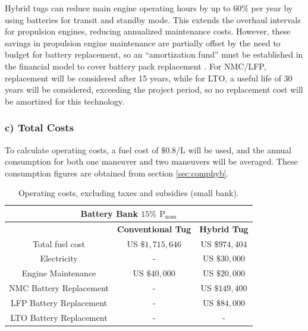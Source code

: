 Hybrid tugs can reduce main engine operating hours by up to $60\%$ per year by using batteries for transit and standby mode. This extends the overhaul intervals for propulsion engines, reducing annualized maintenance costs. However, these savings in propulsion engine maintenance are partially offset by the need to budget for battery replacement, so an “amortization fund” must be established in the financial model to cover battery pack replacement \cite{Wartsila2}. For NMC/LFP, replacement will be considered after 15 years, while for LTO, a useful life of 30 years will be considered, exceeding the project period, so no replacement cost will be amortized for this technology.

\subsubsection{c) Total Costs}

To calculate operating costs, a fuel cost of $\$0.8$/L will be used, and the annual consumption for both one maneuver and two maneuvers will be averaged. These consumption figures are obtained from section \ref{sec:comphyb}.


\begin{table}[H]
	\centering
	\caption{Operating costs, excluding taxes and subsidies (small bank).}
	\label{tab:Op1}
	\begin{tabular}{|c|c|c|}
		\hline
		\multicolumn{3}{|c|}{Battery Bank $15\%$ ${\text{P}}_{\text{nom}}$} \\
		\hline\hline
                   & \textbf{Conventional Tug} & \textbf{Hybrid Tug}\\
		 \hline
   Total fuel cost & US $\$1,715,646$ & US $\$974,404$\\
		 \hline
   Electricity & - & US $\$30,000$\\
		 \hline
   Engine Maintenance & US $\$40,000$ & US $\$20,000$\\
   		 \hline \hline
   NMC Battery Replacement & - & US $\$149,400$\\
		 \hline
   LFP Battery Replacement & - & US $\$84,000$\\
		 \hline
   LTO Battery Replacement & - & - \\
		 \hline
	\end{tabular}
\end{table}

